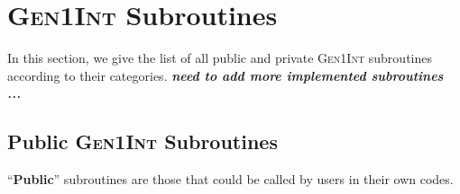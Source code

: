 \documentclass[a4paper,11pt,twoside,openright]{book}
\newcommand{\fixme}[1]{\textbf{\textit{\color{red} #1}}}
\begin{document}
\chapter{\textsc{Gen1Int} Subroutines}
\label{sect:subroutines}

In this section, we give the list of all public and private \textsc{Gen1Int} subroutines according to
their categories. \fixme{need to add more implemented subroutines ...}

\section{Public \textsc{Gen1Int} Subroutines}
\label{sect:public-sub}

``\textbf{Public}'' subroutines are those that could be called by users in their own codes.
\end{document}
